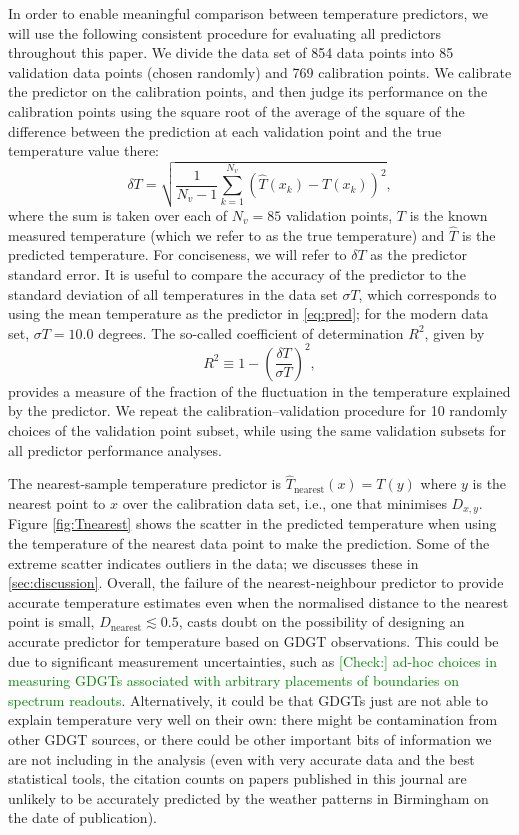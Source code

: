 \documentclass[rmp,aps,twocolumn]{revtex4-1}
\newcommand{\tocheck}[1]{\textcolor{green}{[Check:] #1}}
\def\be{\begin{equation}}
\def\ee{\end{equation}}
\begin{document}
In order to enable meaningful comparison between temperature predictors, we will use the following consistent procedure for evaluating all predictors throughout this paper.  We divide the data set of 854 data points into 85 validation data points (chosen randomly) and 769 calibration points.  We calibrate the predictor on the calibration points, and then judge its performance on the calibration points using the square root of the average of the square of the difference between the prediction at each validation point and the true temperature value there:
\be\label{eq:pred}
\delta T = \sqrt{\frac{1}{N_v-1}\sum_{k=1}^{N_v} (\hat{T} (x_k) - T(x_k))^2},
\ee
where the sum is taken over each of $N_v=85$ validation points, $T$ is the known measured temperature (which we refer to as the true temperature) and $\hat{T}$ is the predicted temperature.  For conciseness, we will refer to $\delta T$ as the predictor standard error.  It is useful to compare the accuracy of the predictor to the standard deviation of all temperatures in the data set $\sigma T$, which corresponds to using the mean temperature as the predictor in \autoref{eq:pred}; for the modern data set, $\sigma T = 10.0$ degrees.  The so-called coefficient of determination $R^2$, given by 
\be
R^2 \equiv 1 - \left(\frac{\delta T}{\sigma T}\right)^2,
\ee
provides a measure of the fraction of the fluctuation in the temperature explained by the predictor.  We repeat the calibration--validation procedure for 10 randomly choices of the validation point subset, while using the same validation subsets for all predictor performance analyses.

The nearest-sample temperature predictor is $\hat{T}_\textrm{nearest} (x) = T(y)$ where $y$ is the nearest point to $x$ over the calibration data set, i.e., one that minimises $D_{x,y}$.  Figure \ref{fig:Tnearest} shows the scatter in the predicted temperature when using the temperature of the nearest data point to make the prediction.  Some of the extreme scatter indicates outliers in the data; we discusses these in \autoref{sec:discussion}.  Overall, the failure of the nearest-neighbour predictor to provide accurate temperature estimates even when the normalised distance to the nearest point is small, $D_\mathrm{nearest} \lesssim 0.5$, casts doubt on the possibility of designing an accurate predictor for temperature based on GDGT observations.  This could be due to significant measurement uncertainties, such as \tocheck{ad-hoc choices in measuring GDGTs associated with arbitrary placements of boundaries on spectrum readouts}.  Alternatively, it could be that GDGTs just are not able to explain temperature very well on their own: there might be contamination from other GDGT sources, or there could be other important bits of information we are not including in the analysis (even with very accurate data and the best statistical tools, the citation counts on papers published in this journal are unlikely to be accurately predicted by the weather patterns in Birmingham on the date of publication).   
\end{document}
